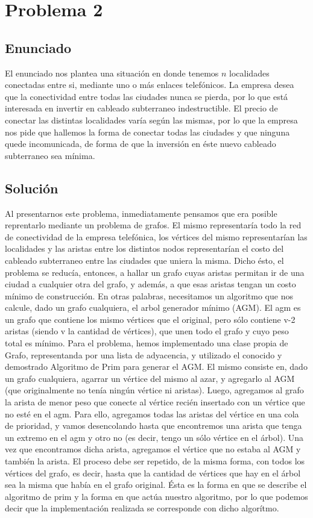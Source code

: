 \section{Problema 2}

\subsection{Enunciado}
El enunciado nos plantea una situación en donde tenemos $n$ localidades conectadas entre si, mediante uno o más enlaces telefónicos. La empresa desea que la conectividad entre todas las ciudades nunca se pierda, por lo que está interesada en invertir en cableado subterraneo indestructible. El precio de conectar las distintas localidades varía según las mismas, por lo que la empresa nos pide que hallemos la forma de conectar todas las ciudades y que ninguna quede incomunicada, de forma de que la inversión en éste nuevo cableado subterraneo sea mínima.

\subsection{Soluci\'on}
Al presentarnos este problema, inmediatamente pensamos que era posible reprentarlo mediante un problema de grafos. El mismo representaría todo la red de conectividad de la empresa telefónica, los vértices del mismo representarían las localidades y las aristas entre los distintos nodos representarían el costo del cableado subterraneo entre las ciudades que uniera la misma.
Dicho ésto, el problema se reducía, entonces, a hallar un grafo cuyas aristas permitan ir de una ciudad a cualquier otra del grafo, y además, a que esas aristas tengan un costo mínimo de construcción. En otras palabras, necesitamos un algoritmo que nos calcule, dado un grafo cualquiera, el arbol generador mínimo (AGM). El agm es un grafo que contiene los mismo vértices que el original, pero sólo contiene v-2 aristas (siendo v la cantidad de vértices), que unen todo el grafo y cuyo peso total es mínimo.
Para el problema, hemos implementado una clase propia de Grafo, representanda por una lista de adyacencia, y utilizado el conocido y demostrado Algoritmo de Prim para generar el AGM. El mismo consiste en, dado un grafo cualquiera, agarrar un vértice del mismo al azar, y agregarlo al AGM (que originalmente no tenía ningún vértice ni aristas). Luego, agregamos al grafo la arista de menor peso que conecte al vértice recién insertado con un vértice que no esté en el agm. Para ello, agregamos todas las aristas del vértice en una cola de prioridad, y vamos desencolando hasta que encontremos una arista que tenga un extremo en el agm y otro no (es decir, tengo un sólo vértice en el árbol). Una vez que encontramos dicha arista, agregamos el vértice que no estaba al AGM y también la arista. El proceso debe ser repetido, de la misma forma, con todos los vértices del grafo, es decir, hasta que la cantidad de vértices que hay en el árbol sea la misma que había en el grafo original. Ésta es la forma en que se describe el algoritmo de prim y la forma en que actúa nuestro algoritmo, por lo que podemos decir que la implementación realizada se corresponde con dicho algorítmo.

